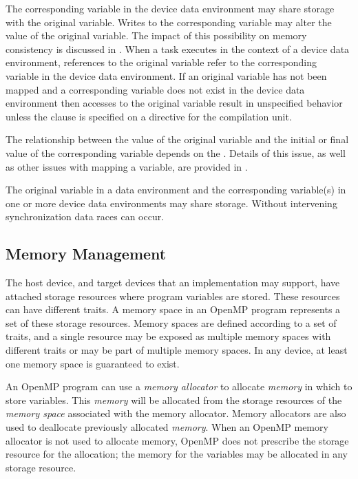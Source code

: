 The corresponding variable in the device data environment may share 
storage with the original variable. Writes to the corresponding 
variable may alter the value of the original variable. The impact 
of this possibility on memory consistency is discussed in 
. When a task executes 
in the context of a device data environment, references to the 
original variable refer to the corresponding variable in the device 
data environment. If an original variable has not been mapped and a 
corresponding variable does not exist in the device data environment 
then accesses to the original variable result in unspecified behavior 
unless the  clause is specified on a 
 directive for the compilation unit.

The relationship between the value of the original variable and the 
initial or final value of the corresponding variable depends on the 
. Details of this issue, as well as other issues with 
mapping a variable, are provided in .

The original variable in a data environment and the corresponding 
variable(s) in one or more device data environments may share storage. 
Without intervening synchronization data races can occur.

\subsection{Memory Management}
The host device, and target devices that an implementation may support, 
have attached storage resources where program variables are stored. 
These resources can have different traits. A memory space in an OpenMP 
program represents a set of these storage resources. Memory spaces are 
defined according to a set of traits, and a single resource may be exposed 
as multiple memory spaces with different traits or may be part of multiple 
memory spaces. In any device, at least one memory space is guaranteed to exist.

An OpenMP program can use a \emph{memory allocator} to allocate \emph{memory} 
in which to store variables. This \emph{memory} will be allocated from the 
storage resources of the \emph{memory space} associated with the memory 
allocator. Memory allocators are also used to deallocate previously allocated
\emph{memory}. When an OpenMP memory allocator is not used to allocate memory,
OpenMP does not prescribe the storage resource for the allocation; the memory 
for the variables may be allocated in any storage resource.



